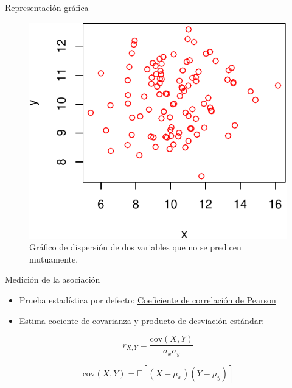 \documentclass[
  11pt,
  ignorenonframetext,
]{beamer}
\begin{document}
\begin{frame}{Representación gráfica}
\protect\hypertarget{representaciuxf3n-gruxe1fica-1}{}
\begin{figure}

{\centering \includegraphics{Correlacion_files/figure-beamer/unnamed-chunk-2-1} 

}

\caption{Gráfico de dispersión de dos variables que no se predicen mutuamente.}\label{fig:unnamed-chunk-2}
\end{figure}
\end{frame}

\begin{frame}{Medición de la asociación}
\protect\hypertarget{mediciuxf3n-de-la-asociaciuxf3n}{}
\begin{itemize}
\item
  Prueba estadística por defecto:
  \href{https://en.wikipedia.org/wiki/Pearson_correlation_coefficient}{Coeficiente
  de correlación de Pearson}
\item
  Estima cociente de covarianza y producto de desviación estándar:
\end{itemize}

\begin{equation}
r_{X, Y} = \frac{\mathrm{cov}(X, Y)}{\sigma_{x} \sigma_{y}}
\end{equation}

\begin{equation}
\mathrm{cov}(X, Y) = \mathbb{E}[(X - \mu_x) (Y - \mu_y)]
\end{equation}
\end{frame}
\end{document}
